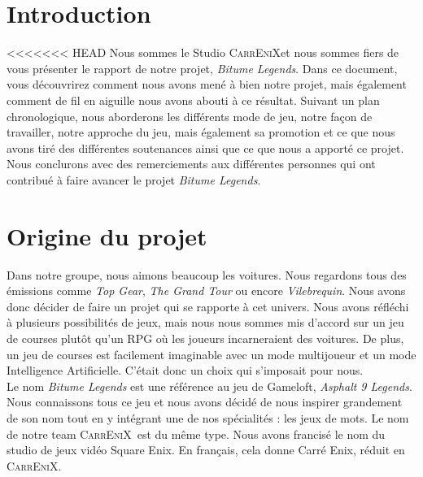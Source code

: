 \documentclass[a4paper,12pt]{article}
\newcommand{\btmlgs}{\textsl{Bitume Legends}}
\newcommand{\AI}{Intelligence Artificielle}
\newcommand{\CEX}{\textsc{CarrEniX}}
\begin{document}
  

    

    \newpage

    \tableofcontents

    \newpage

    \section*{Introduction}
<<<<<<< HEAD
    Nous sommes le Studio \CEX\;et nous sommes fiers de vous présenter le rapport de notre projet, \btmlgs. 
    Dans ce document, vous découvrirez comment nous avons mené à bien notre projet, mais également comment de fil en aiguille nous avons abouti à ce résultat. Suivant un plan chronologique, nous aborderons les différents mode de jeu, notre façon de travailler, notre approche du jeu, mais également sa promotion et ce que nous avons tiré des différentes soutenances ainsi que ce que nous a apporté ce projet. Nous conclurons avec des remerciements aux différentes personnes qui ont contribué à faire avancer le projet \btmlgs.


    \section{Origine du projet}
        Dans notre groupe, nous aimons beaucoup les voitures. Nous regardons tous des émissions comme 
        \textit{Top Gear}, \textit{The Grand Tour} ou encore \textit{Vilebrequin}. Nous avons donc décider de faire
        un projet qui se rapporte à cet univers. Nous avons réfléchi à plusieurs possibilités de jeux, mais nous
        nous sommes mis d'accord sur un jeu de courses plutôt qu'un RPG où les joueurs incarneraient des voitures.
        De plus, un jeu de courses est facilement imaginable avec un mode multijoueur et un mode \AI. C'était donc un choix qui s'imposait pour nous.\\

        Le nom \textit{Bitume Legends} est une référence au jeu de Gameloft, \textit{Asphalt 9 Legends}.
        Nous connaissons tous ce jeu et nous avons décidé de nous inspirer grandement de son nom tout en y intégrant
        une de nos spécialités : les jeux de mots. Le nom de notre team \CEX\, est du même type. Nous avons 
        francisé le nom du studio de jeux vidéo Square Enix. En français, cela donne Carré Enix, réduit en
        \CEX.\\
    
\end{document}
